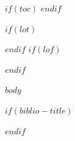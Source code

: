 \documentclass[11pt,a4paper]{article}
\begin{document}
\restoregeometry


$if(toc)$
{
\hypersetup{linkcolor=black}
\setcounter{tocdepth}{3}
\tableofcontents
}
$endif$

$if(lot)$
\newpage
\listoftables
$endif$
$if(lof)$
\newpage
\listoffigures
$endif$
\newpage
{}

$body$

$if(biblio-title)$
\begingroup
\raggedright
\printbibliography[title=$biblio-title$]
\endgroup
$endif$
\end{document}
